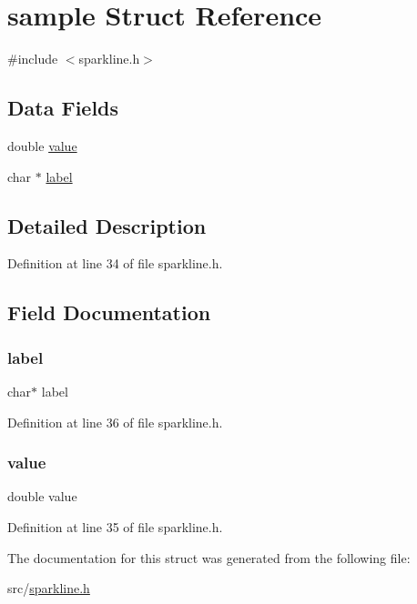 \hypertarget{structsample}{}\section{sample Struct Reference}
\label{structsample}


{\ttfamily \#include $<$sparkline.\+h$>$}

\subsection*{Data Fields}
\begin{DoxyCompactItemize}
\item 
double \hyperlink{structsample_aee90379adb0307effb138f4871edbc5c}{value}
\item 
char $\ast$ \hyperlink{structsample_acf60de4c64d60c1b9449c056bc6bfcf7}{label}
\end{DoxyCompactItemize}


\subsection{Detailed Description}


Definition at line 34 of file sparkline.\+h.



\subsection{Field Documentation}
\mbox{\label{structsample_acf60de4c64d60c1b9449c056bc6bfcf7}} 
\subsubsection{\texorpdfstring{label}{label}}
{\footnotesize\ttfamily char$\ast$ label}



Definition at line 36 of file sparkline.\+h.

\mbox{\label{structsample_aee90379adb0307effb138f4871edbc5c}} 
\subsubsection{\texorpdfstring{value}{value}}
{\footnotesize\ttfamily double value}



Definition at line 35 of file sparkline.\+h.



The documentation for this struct was generated from the following file\+:\begin{DoxyCompactItemize}
\item 
src/\hyperlink{sparkline_8h}{sparkline.\+h}\end{DoxyCompactItemize}
